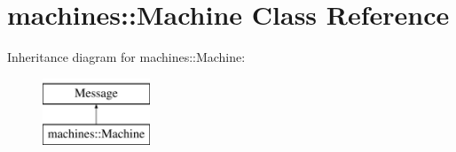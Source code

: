\hypertarget{classmachines_1_1Machine}{\section{machines\-:\-:Machine Class Reference}
\label{classmachines_1_1Machine}
}
Inheritance diagram for machines\-:\-:Machine\-:\begin{figure}[H]
\begin{center}
\leavevmode
\includegraphics[height=2.000000cm]{classmachines_1_1Machine}
\end{center}
\end{figure}
